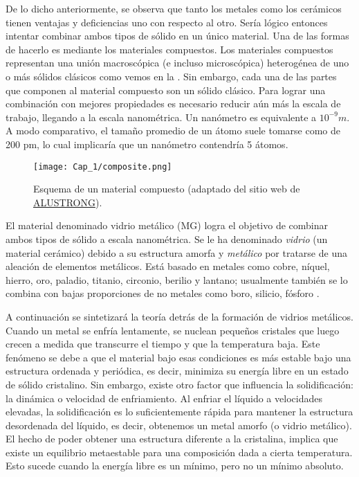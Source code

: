 De lo dicho anteriormente, se observa que tanto los metales como los cerámicos tienen ventajas y deficiencias uno con respecto al otro. Sería lógico entonces intentar combinar ambos tipos de sólido en un único material. Una de las formas de hacerlo es mediante los materiales compuestos. Los materiales compuestos representan una unión macroscópica (e incluso microscópica) heterogénea de uno o más sólidos clásicos como vemos en la . Sin embargo, cada una de las partes que componen al material compuesto son un sólido clásico. Para lograr una combinación con mejores propiedades es necesario reducir aún más la escala de trabajo, llegando a la escala nanométrica. Un nanómetro es equivalente a $10^{-9} m$. A modo comparativo, el tamaño promedio de un átomo suele tomarse como de 200 pm, lo cual implicaría que un nanómetro contendría 5 átomos.

\begin{figure}[h!]
 \centering
 \texttt{[image: Cap\_1/composite.png]}
 \caption[Esquema de un material compuesto]{Esquema de un material compuesto (adaptado del sitio web de \href{http://www.alustrong.com}{ALUSTRONG}).}
 \label{C1:fg:composite}
\end{figure}

El material denominado vidrio metálico (MG) logra el objetivo de combinar ambos tipos de sólido a escala nanométrica. Se le ha denominado \textit{vidrio} (un material cerámico) debido a su estructura amorfa y \textit{metálico} por tratarse de una aleación de elementos metálicos. Está basado en metales como cobre, níquel, hierro, oro, paladio, titanio, circonio, berilio y lantano; usualmente también se lo combina con bajas proporciones de no metales como boro, silicio, fósforo \citep{andrievski13}.

A continuación se sintetizará la teoría detrás de la formación de vidrios metálicos. Cuando un metal se enfría lentamente, se nuclean pequeños cristales que luego crecen a medida que transcurre el tiempo y que la temperatura baja. Este fenómeno se debe a que el material bajo esas condiciones es más estable bajo una estructura ordenada y periódica, es decir, minimiza su energía libre en un estado de sólido cristalino. Sin embargo, existe otro factor que influencia la solidificación: la dinámica o velocidad de enfriamiento. Al enfriar el líquido a velocidades elevadas, la solidificación es lo suficientemente rápida para mantener la estructura desordenada del líquido, es decir, obtenemos un metal amorfo (o vidrio metálico). El hecho de poder obtener una estructura diferente a la cristalina, implica que existe un equilibrio metaestable para una composición dada a cierta temperatura. Esto sucede cuando la energía libre es un mínimo, pero no un mínimo absoluto.

